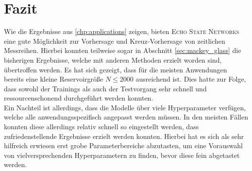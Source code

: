 \section{Fazit}
Wie die Ergebnisse aus \ref{chp:applications} zeigen, bieten \textsc{Echo State Networks} eine gute Möglichkeit zur Vorhersage und Kreuz-Vorhersage von zeitlichen Messreihen. Hierbei konnten teilweise sogar in Abschnitt \ref{sec:mackey_glass} die bisherigen Ergebnisse, welche mit anderen Methoden erzielt worden sind, übertroffen werden. Es hat sich gezeigt, dass für die meisten Anwendungen bereits eine kleine Reservoirgröße $N \leq 2000$ ausreichend ist. Dies hatte zur Folge, dass sowohl der Trainings als auch der Testvorgang sehr schnell und ressourcenschonend durchgeführt werden konnten.\\

Ein Nachteil ist allerdings, dass die Modelle über viele Hyperparameter verfügen, welche alle anwendungsspezifisch angepasst werden müssen. In den meisten Fällen konnten diese allerdings relativ schnell so eingestellt werden, dass zufriedenstellende Ergebnisse erzielt werden konnten. Hierbei hat es sich als sehr hilfreich erwiesen erst grobe Parameterbereiche abzutasten, um eine Vorauswahl von vielversprechenden Hyperparametern zu finden, bevor diese fein abgetastet werden. 